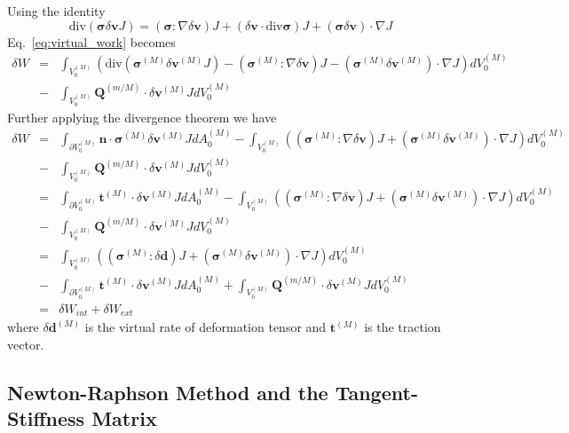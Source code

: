 Using the identity
%
\begin{equation}
\text{div}(\pmb{\sigma}\delta\pmb{v} J) =  (\pmb{\sigma}:\nabla\delta\pmb{v})J + (\delta \pmb{v} \cdot \text{div}\pmb{\sigma})J + (\pmb{\sigma} \delta\pmb{v})\cdot \nabla J
\end{equation}
%
Eq.\ \eqref{eq:virtual_work} becomes
%
\begin{eqnarray}
\delta W &=& \int_{V_0^{(M)}} \left(\text{div}(\pmb{\sigma}^{(M)} \delta\pmb{v}^{(M)} J) - (\pmb{\sigma}^{(M)}:\nabla \delta \pmb{v}) J - (\pmb{\sigma}^{(M)}\delta \pmb{v}^{(M)})\cdot \nabla J \right)dV_0^{(M)} \nonumber\\
%
&-& \int_{V_0^{(M)}} \pmb{Q}^{(m/M)} \cdot \delta \pmb{v}^{(M)}J dV_0^{(M)} 
%
\end{eqnarray}
%
Further applying the divergence theorem we have
%
\begin{eqnarray}
\delta W &=& \int_{\partial V_0^{(M)}} \pmb{n} \cdot \pmb{\sigma}^{(M)} \delta\pmb{v}^{(M)} J dA_0^{(M)} - \int_{V_0^{(M)}} \left((\pmb{\sigma}^{(M)}:\nabla \delta \pmb{v}) J + (\pmb{\sigma}^{(M)}\delta \pmb{v}^{(M)})\cdot \nabla J \right)dV_0^{(M)} \nonumber\\
%
&-& \int_{V_0^{(M)}} \pmb{Q}^{(m/M)} \cdot \delta \pmb{v}^{(M)}J dV_0^{(M)} \nonumber\\
%
&=& \int_{\partial V_0^{(M)}} \pmb{t}^{(M)} \cdot \delta\pmb{v}^{(M)} J dA_0^{(M)} - \int_{V_0^{(M)}} \left((\pmb{\sigma}^{(M)}:\nabla \delta \pmb{v}) J + (\pmb{\sigma}^{(M)}\delta \pmb{v}^{(M)})\cdot \nabla J \right)dV_0^{(M)} \nonumber\\
%
&-& \int_{V_0^{(M)}} \pmb{Q}^{(m/M)} \cdot \delta \pmb{v}^{(M)}J dV_0^{(M)} \nonumber\\
&=& \int_{V_0^{(M)}} \left((\pmb{\sigma}^{(M)}:\delta \pmb{d}) J + (\pmb{\sigma}^{(M)}\delta \pmb{v}^{(M)})\cdot \nabla J \right)dV_0^{(M)} \nonumber\\
%
&-& \int_{\partial V_0^{(M)}} \pmb{t}^{(M)} \cdot \delta\pmb{v}^{(M)} J dA_0^{(M)} + \int_{V_0^{(M)}} \pmb{Q}^{(m/M)} \cdot \delta \pmb{v}^{(M)}J dV_0^{(M)} \nonumber\\
%
&=& \delta W_{int} + \delta W_{ext}
\label{eq:virtual_work_final}
\end{eqnarray}
%
where $\delta \pmb{d}^{(M)}$ is the virtual rate of deformation tensor and $\pmb{t}^{(M)}$ is the traction vector.

\subsection{Newton-Raphson Method and the Tangent-Stiffness Matrix}

